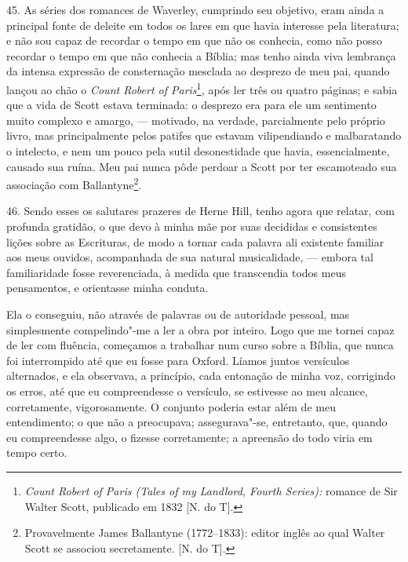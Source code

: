 45. As séries dos romances de Waverley, cumprindo seu objetivo, eram
ainda a principal fonte de deleite em todos os lares em que havia
interesse pela literatura; e não sou capaz de recordar o tempo em que
não os conhecia, como não posso recordar o tempo em que não conhecia a
Bíblia; mas tenho ainda viva lembrança da intensa expressão de
consternação mesclada ao desprezo de meu pai, quando lançou ao chão o
\emph{Count Robert of Paris}\footnote{\emph{Count Robert of Paris (Tales
  of my Landlord, Fourth Series):} romance de Sir Walter Scott,
  publicado em 1832 {[}N. do T{]}.}\emph{,} após ler três ou quatro
páginas; e sabia que a vida de Scott estava terminada: o desprezo era
para ele um sentimento muito complexo e amargo, --- motivado, na verdade,
parcialmente pelo próprio livro, mas principalmente pelos patifes que
estavam vilipendiando e malbaratando o intelecto, e nem um pouco pela
sutil desonestidade que havia, essencialmente, causado sua ruína. Meu
pai nunca pôde perdoar a Scott por ter escamoteado sua associação com
Ballantyne\footnote{Provavelmente James Ballantyne (1772--1833): editor
  inglês ao qual Walter Scott se associou secretamente. {[}N. do T{]}.}.

46. Sendo esses os salutares prazeres de Herne Hill, tenho agora que
relatar, com profunda gratidão, o que devo à minha mãe por suas
decididas e consistentes lições sobre as Escrituras, de modo a tornar
cada palavra ali existente familiar aos meus ouvidos, acompanhada de sua
natural musicalidade, --- embora tal familiaridade fosse reverenciada, à
medida que transcendia todos meus pensamentos, e orientasse minha
conduta.

Ela o conseguiu, não através de palavras ou de autoridade pessoal, mas
simplesmente compelindo"-me a ler a obra por inteiro. Logo que me tornei
capaz de ler com fluência, começamos a trabalhar num curso sobre a
Bíblia, que nunca foi interrompido até que eu fosse para Oxford. Líamos
juntos versículos alternados, e ela observava, a princípio, cada
entonação de minha voz, corrigindo os erros, até que eu compreendesse o
versículo, se estivesse ao meu alcance, corretamente, vigorosamente. O
conjunto poderia estar além de meu entendimento; o que não a preocupava;
assegurava"-se, entretanto, que, quando eu compreendesse algo, o fizesse
corretamente; a apreensão do todo viria em tempo certo.

